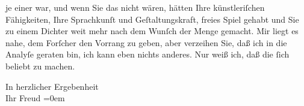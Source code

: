                je einer war, und wenn Sie das nicht wären, hätten Ihre künstleriſchen Fähigkeiten,
               Ihre Sprachkunſt und Geſtaltungskraft, freies Spiel gehabt und Sie zu einem Dichter
               weit mehr nach dem Wunſch der Menge gemacht. Mir liegt es nahe, dem Forſcher den
               Vorrang zu geben, aber verzeihen Sie, daß ich in die Analyſe geraten bin, ich kann
               eben nichts anderes. Nur weiß ich, daß die \label{T_L03887-2v}\label{T_L03887-2}{ }ſich beliebt zu machen.\pend
           
\pstart
           In herzlicher Ergebenheit{\\[\baselineskip]} Ihr \spacefill\mbox{Freud}\pend
           \leftskip=0em{}\endnumbering{}
\begin{anhang}
\end{anhang}\newcommand{\dateiname}{L03887}\newcommand{\titel}{Sigmund Freud an Arthur Schnitzler, 14. 5. 1922}\newcommand{\editorInnen}{Selma Jahnke und Martin Anton Müller}
